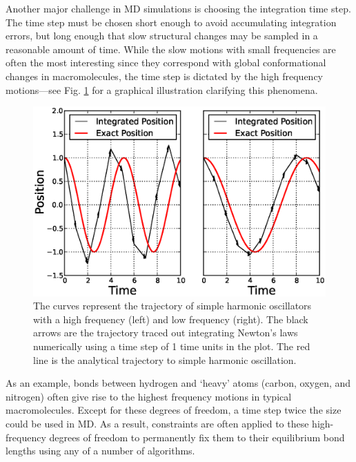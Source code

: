 Another major challenge in MD simulations is choosing the integration time step.
The time step must be chosen short enough to avoid accumulating integration
errors, but long enough that slow structural changes may be sampled in a
reasonable amount of time. While the slow motions with small frequencies are
often the most interesting since they correspond with global conformational
changes in macromolecules, the time step is dictated by the high frequency
motions---see Fig. \ref{fig1:TimeStepDemo} for a graphical illustration
clarifying this phenomena.

\begin{figure}
   \includegraphics[width=6.5in]{TimeStepDemo.ps}
   \caption{The curves represent the trajectory of simple harmonic oscillators
            with a high frequency (left) and low frequency (right). The black
            arrows are the trajectory traced out integrating Newton's laws
            numerically using a time step of 1 time units in the plot. The
            red line is the analytical trajectory to simple harmonic
            oscillation.}
   \label{fig1:TimeStepDemo}
\end{figure}

As an example, bonds between hydrogen and `heavy' atoms (\eg carbon, oxygen, and
nitrogen) often give rise to the highest frequency motions in typical
macromolecules. Except for these degrees of freedom, a time step twice the size
could be used in MD. As a result, constraints are often applied to these
high-frequency degrees of freedom to permanently fix them to their equilibrium
bond lengths using any of a number of algorithms.
\cite{Ryckaert_JComputPhys_1977_v23_p327, Andersen1983,
Miyamoto_JComputChem_1992_v13_p952, Forester_JComputChem_1998_v19_p102,
Lee_JComputPhys_2005_v210_p171}

